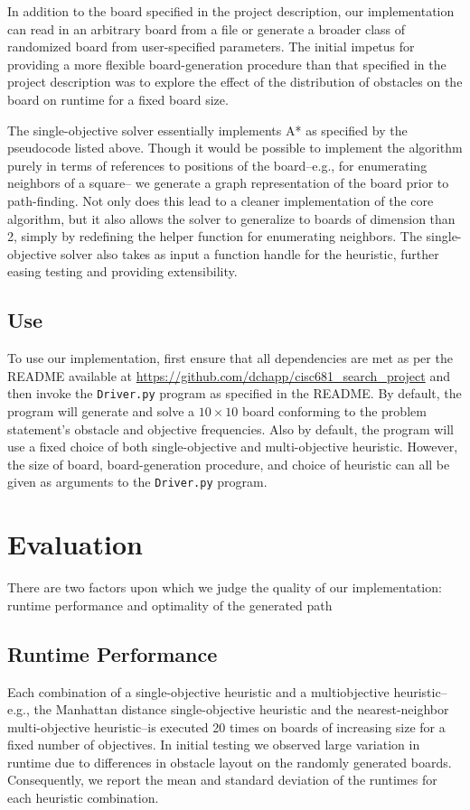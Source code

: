\documentclass[12pt, conference, compsocconf]{IEEEtran}
\begin{document}
In addition to the board specified in the project description, our
implementation can read in an arbitrary board from a file or generate a broader
class of randomized board from user-specified parameters.  The initial impetus
for providing a more flexible board-generation procedure than that specified in
the project description was to explore the effect of the distribution of
obstacles on the board on runtime for a fixed board size.

The single-objective solver essentially implements A* as specified by the pseudocode
listed above. Though it would be possible to implement the algorithm purely in terms
of references to positions of the board--e.g., for enumerating neighbors of a square--
we generate a graph representation of the board prior to path-finding. Not only does 
this lead to a cleaner implementation of the core algorithm, but it also allows the 
solver to generalize to boards of dimension than 2, simply by redefining the helper 
function for enumerating neighbors. The single-objective solver also takes as input
a function handle for the heuristic, further easing testing and providing extensibility. 

\subsection{Use}
To use our implementation, first ensure that all dependencies are met as per
the README available at \url{https://github.com/dchapp/cisc681_search_project}
and then invoke the \texttt{Driver.py} program as specified in the README.
By default, the program will generate and solve a $10 \times 10$ board conforming 
to the problem statement's obstacle and objective frequencies.  
Also by default, the program will use a fixed choice of both single-objective and
multi-objective heuristic. However, the size of board, board-generation
procedure, and choice of heuristic can all be given as arguments to the
\texttt{Driver.py} program.

\section{Evaluation}
There are two factors upon which we judge the quality of our implementation:
runtime performance and optimality of the generated path

\subsection{Runtime Performance}
Each combination of a single-objective heuristic and a multiobjective
heuristic--e.g., the Manhattan distance single-objective heuristic and the
nearest-neighbor multi-objective heuristic--is executed 20 times on boards of
increasing size for a fixed number of objectives.  In initial testing we
observed large variation in runtime due to differences in obstacle layout on
the randomly generated boards.  Consequently, we report the mean and standard
deviation of the runtimes for each heuristic combination.
\end{document}
